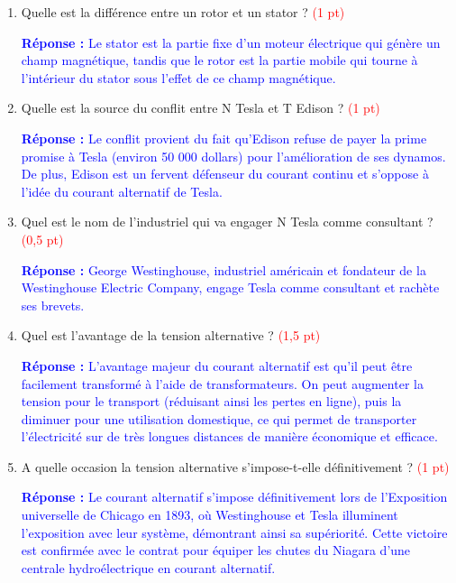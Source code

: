 \documentclass[10pt,a4paper]{article}
\begin{document}
\begin{enumerate}[itemsep=1mm]
\item Quelle est la différence entre un rotor et un stator ? \hfill \textcolor{red}{(1 pt)}

{\small \textcolor{blue}{\textbf{Réponse :} Le stator est la partie fixe d'un moteur électrique qui génère un champ magnétique, tandis que le rotor est la partie mobile qui tourne à l'intérieur du stator sous l'effet de ce champ magnétique.}}

\item Quelle est la source du conflit entre N Tesla et T Edison ? \hfill \textcolor{red}{(1 pt)}

{\small \textcolor{blue}{\textbf{Réponse :} Le conflit provient du fait qu'Edison refuse de payer la prime promise à Tesla (environ 50 000 dollars) pour l'amélioration de ses dynamos. De plus, Edison est un fervent défenseur du courant continu et s'oppose à l'idée du courant alternatif de Tesla.}}

\item Quel est le nom de l'industriel qui va engager N Tesla comme consultant ? \hfill \textcolor{red}{(0,5 pt)}

{\small \textcolor{blue}{\textbf{Réponse :} George Westinghouse, industriel américain et fondateur de la Westinghouse Electric Company, engage Tesla comme consultant et rachète ses brevets.}}

\item Quel est l'avantage de la tension alternative ? \hfill \textcolor{red}{(1,5 pt)}

{\small \textcolor{blue}{\textbf{Réponse :} L'avantage majeur du courant alternatif est qu'il peut être facilement transformé à l'aide de transformateurs. On peut augmenter la tension pour le transport (réduisant ainsi les pertes en ligne), puis la diminuer pour une utilisation domestique, ce qui permet de transporter l'électricité sur de très longues distances de manière économique et efficace.}}

\item A quelle occasion la tension alternative s'impose-t-elle définitivement ? \hfill \textcolor{red}{(1 pt)}

{\small \textcolor{blue}{\textbf{Réponse :} Le courant alternatif s'impose définitivement lors de l'Exposition universelle de Chicago en 1893, où Westinghouse et Tesla illuminent l'exposition avec leur système, démontrant ainsi sa supériorité. Cette victoire est confirmée avec le contrat pour équiper les chutes du Niagara d'une centrale hydroélectrique en courant alternatif.}}


\end{enumerate}
\end{document}
